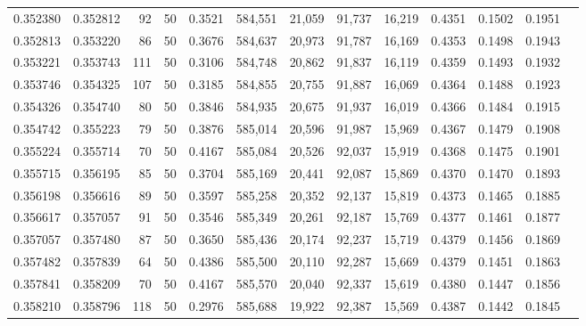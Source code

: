 \begin{tabular}{rrrrrrrrrrrrr}
0.352380 & 0.352812 &    92 &  50 &                                     0.3521 & 584,551 &  21,059 &  91,737 &  16,219 & 0.4351 & 0.1502 & 0.1951 \\
0.352813 & 0.353220 &    86 &  50 &                                     0.3676 & 584,637 &  20,973 &  91,787 &  16,169 & 0.4353 & 0.1498 & 0.1943 \\
0.353221 & 0.353743 &   111 &  50 &                                     0.3106 & 584,748 &  20,862 &  91,837 &  16,119 & 0.4359 & 0.1493 & 0.1932 \\
0.353746 & 0.354325 &   107 &  50 &                                     0.3185 & 584,855 &  20,755 &  91,887 &  16,069 & 0.4364 & 0.1488 & 0.1923 \\
0.354326 & 0.354740 &    80 &  50 &                                     0.3846 & 584,935 &  20,675 &  91,937 &  16,019 & 0.4366 & 0.1484 & 0.1915 \\
0.354742 & 0.355223 &    79 &  50 &                                     0.3876 & 585,014 &  20,596 &  91,987 &  15,969 & 0.4367 & 0.1479 & 0.1908 \\
0.355224 & 0.355714 &    70 &  50 &                                     0.4167 & 585,084 &  20,526 &  92,037 &  15,919 & 0.4368 & 0.1475 & 0.1901 \\
0.355715 & 0.356195 &    85 &  50 &                                     0.3704 & 585,169 &  20,441 &  92,087 &  15,869 & 0.4370 & 0.1470 & 0.1893 \\
0.356198 & 0.356616 &    89 &  50 &                                     0.3597 & 585,258 &  20,352 &  92,137 &  15,819 & 0.4373 & 0.1465 & 0.1885 \\
0.356617 & 0.357057 &    91 &  50 &                                     0.3546 & 585,349 &  20,261 &  92,187 &  15,769 & 0.4377 & 0.1461 & 0.1877 \\
0.357057 & 0.357480 &    87 &  50 &                                     0.3650 & 585,436 &  20,174 &  92,237 &  15,719 & 0.4379 & 0.1456 & 0.1869 \\
0.357482 & 0.357839 &    64 &  50 &                                     0.4386 & 585,500 &  20,110 &  92,287 &  15,669 & 0.4379 & 0.1451 & 0.1863 \\
0.357841 & 0.358209 &    70 &  50 &                                     0.4167 & 585,570 &  20,040 &  92,337 &  15,619 & 0.4380 & 0.1447 & 0.1856 \\
0.358210 & 0.358796 &   118 &  50 &                                     0.2976 & 585,688 &  19,922 &  92,387 &  15,569 & 0.4387 & 0.1442 & 0.1845 \\

\end{tabular}
